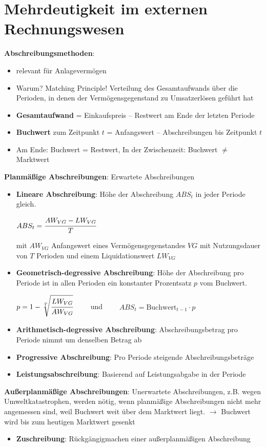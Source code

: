 \section{Mehrdeutigkeit im externen Rechnungswesen}

\textbf{Abschreibungsmethoden}: 
\begin{itemize}
	\item relevant für Anlagevermögen
	\item Warum? Matching Principle! Verteilung des Gesamtaufwands über die Perioden, in denen der Vermögensgegenstand zu Umsatzerlösen geführt hat
	\item \textbf{Gesamtaufwand} = Einkaufspreis $–$ Restwert am Ende der letzten Periode
	\item \textbf{Buchwert} zum Zeitpunkt $t$ = Anfangswert $–$ Abschreibungen bis Zeitpunkt $t$
	\item Am Ende: Buchwert = Restwert, In der Zwischenzeit: Buchwert $\neq$ Marktwert
\end{itemize}
\bigskip
\textbf{Planmäßige Abschreibungen}: Erwartete Abschreibungen
\begin{itemize}
	\item \textbf{Lineare Abschreibung}: Höhe der Abschreibung $ABS_t$ in jeder Periode gleich.
	\begin{tightcenter}
		$ABS_t=\cfrac{AW_{VG}-LW_{VG}}{T}$
	\end{tightcenter}
	mit $AW_{VG}$ Anfangswert eines Vermögensgegenstandes $VG$ mit Nutzungsdauer von $T$ Perioden und einem Liquidationswert $LW_{VG}$
	\item \textbf{Geometrisch-degressive Abschreibung}: Höhe der Abschreibung pro Periode ist in allen
	Perioden ein konstanter Prozentsatz $p$ vom Buchwert.
	\begin{tightcenter}
		$p=1-\sqrt[T]{\cfrac{LW_{VG}}{AW_{VG}}}\qquad$ und $\qquad ABS_t=\text{Buchwert}_{t-1}\cdot p$
	\end{tightcenter}
	\item \textbf{Arithmetisch-degressive Abschreibung}: Abschreibungsbetrag pro Periode nimmt um denselben Betrag ab
	\item \textbf{Progressive Abschreibung}: Pro Periode steigende Abschreibungsbeträge
	\item \textbf{Leistungsabschreibung}: Basierend auf Leistungsabgabe in der Periode
\end{itemize}
\bigskip
\textbf{Außerplanmäßige Abschreibungen}: Unerwartete Abschreibungen, z.B. wegen Umweltkatastrophen, werden nötig, wenn planmäßige Abschreibungen nicht mehr angemessen sind, weil Buchwert weit über dem
Marktwert liegt. $\rightarrow$ Buchwert wird bis zum heutigen Marktwert gesenkt
\begin{itemize}
	\item \textbf{Zuschreibung}: Rückgängigmachen einer außerplanmäßigen Abschreibung
\end{itemize}